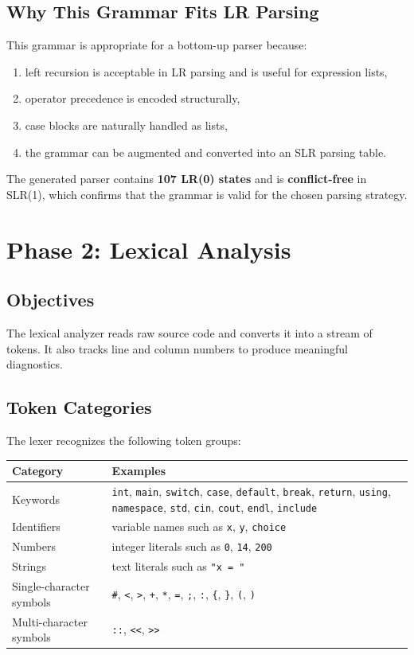 \documentclass[12pt,a4paper]{article}
\begin{document}
\subsection{Why This Grammar Fits LR Parsing}
This grammar is appropriate for a bottom-up parser because:

\begin{enumerate}
    \item left recursion is acceptable in LR parsing and is useful for expression lists,
    \item operator precedence is encoded structurally,
    \item case blocks are naturally handled as lists,
    \item the grammar can be augmented and converted into an SLR parsing table.
\end{enumerate}

The generated parser contains \textbf{107 LR(0) states} and is \textbf{conflict-free} in SLR(1), which confirms that the grammar is valid for the chosen parsing strategy.

\section{Phase 2: Lexical Analysis}
\subsection{Objectives}
The lexical analyzer reads raw source code and converts it into a stream of tokens. It also tracks line and column numbers to produce meaningful diagnostics.

\subsection{Token Categories}
The lexer recognizes the following token groups:

\begin{center}
\begin{tabular}{|p{}|p{}|}
\hline
\textbf{Category} & \textbf{Examples} \\
\hline
Keywords & \texttt{int}, \texttt{main}, \texttt{switch}, \texttt{case}, \texttt{default}, \texttt{break}, \texttt{return}, \texttt{using}, \texttt{namespace}, \texttt{std}, \texttt{cin}, \texttt{cout}, \texttt{endl}, \texttt{include} \\
\hline
Identifiers & variable names such as \texttt{x}, \texttt{y}, \texttt{choice} \\
\hline
Numbers & integer literals such as \texttt{0}, \texttt{14}, \texttt{200} \\
\hline
Strings & text literals such as \texttt{"x = "} \\
\hline
Single-character symbols & \texttt{\#}, \texttt{<}, \texttt{>}, \texttt{+}, \texttt{*}, \texttt{=}, \texttt{;}, \texttt{:}, \texttt{\{}, \texttt{\}}, \texttt{(}, \texttt{)} \\
\hline
Multi-character symbols & \texttt{::}, \texttt{<<}, \texttt{>>} \\
\hline
\end{tabular}
\end{center}
\end{document}

